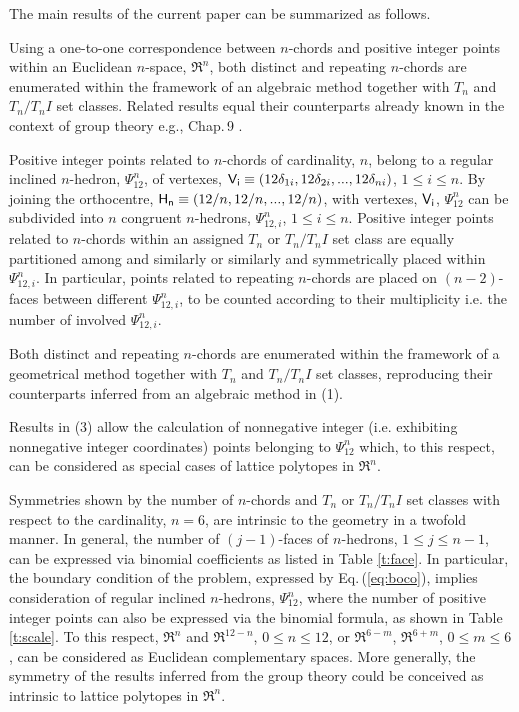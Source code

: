 \documentclass[12pt,a4paper]{article}
\begin{document}
The main results of the current paper can be summarized as follows.
\begin{trivlist}%
\item[\hspace\labelsep{\bf (1)}]
Using a one-to-one correspondence between $n$-chords and
positive integer points within an Euclidean $n$-space, $\Re^n$, both distinct
and repeating $n$-chords are enumerated within the framework of an algebraic
method together with $T_n$ and $T_n/T_nI$ set classes.   Related results equal
their counterparts already known in the context of group theory e.g.,
\cite{Fri99} \cite{Ben06} Chap.\,9 \cite{Hoo07}.
\item[\hspace\labelsep{\bf (2)}]
Positive integer points related to $n$-chords of cardinality, $n$, belong to a
regular inclined $n$-hedron, $\Psi_{12}^n$, of vertexes,
${\sf V_i}\equiv(12\delta_{1i}, 12\delta_{2i},...,12\delta_{ni})$,
$1\le i\le n$.  By joining the orthocentre,  
${\sf H_n}\equiv(12/n, 12/n,...,12/n)$, with vertexes, ${\sf V_i}$,
$\Psi_{12}^n$ can be subdivided into $n$ congruent $n$-hedrons,
$\Psi_{12,i}^n$, $1\le i\le n$.   Positive integer points related to 
$n$-chords within an assigned $T_n$ or $T_n/T_nI$ set class are equally
partitioned among and similarly or similarly and symmetrically placed within
$\Psi_{12,i}^n$.   In particular, points related to repeating $n$-chords are
placed on $(n-2)$-faces
between different $\Psi_{12,i}^n$, to be counted according to their
multiplicity i.e. the number of involved $\Psi_{12,i}^n$.
\item[\hspace\labelsep{\bf (3)}]
Both distinct and repeating $n$-chords are enumerated within the framework of a
geometrical method together with $T_n$ and $T_n/T_nI$ set classes, reproducing
their counterparts inferred from an algebraic method in (1).
\item[\hspace\labelsep{\bf (4)}]
Results in (3) allow the calculation of nonnegative integer (i.e. exhibiting
nonnegative integer coordinates) points belonging to $\Psi_{12}^n$ which, to
this respect, can be considered as special cases of lattice polytopes in
$\Re^n$.
\item[\hspace\labelsep{\bf (5)}]
Symmetries shown by the number of $n$-chords and $T_n$ or $T_n/T_nI$ set classes
with respect
to the cardinality, $n=6$, are intrinsic to the geometry in a twofold manner.
In general, the number of $(j-1)$-faces of $n$-hedrons, $1\le j\le n-1$, can
be expressed via binomial coefficients as listed in Table \ref{t:face}.   In
particular, the boundary condition of the problem, expressed by
Eq.\,(\ref{eq:boco}), implies consideration of regular inclined $n$-hedrons,
$\Psi_{12}^n$, where the number of positive integer points can also be
expressed via the binomial formula, as shown in Table \ref{t:scale}.   To this
respect, $\Re^n$ and $\Re^{12-n}$, $0\le n\le12$, or $\Re^{6-m}$, $\Re^{6+m}$,
$0\le m\le6$, can be considered as Euclidean complementary spaces.
More generally, the symmetry of the results inferred from the group
theory could be conceived as intrinsic to lattice polytopes in $\Re^n$.
\end{trivlist}%
%
\end{document}
